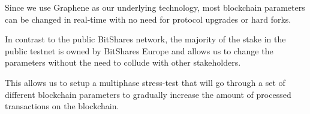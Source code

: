 Since we use Graphene as our underlying technology, most blockchain parameters
can be changed in real-time with no need for protocol upgrades or hard forks.

In contrast to the public BitShares network, the majority of the stake in the
public testnet is owned by BitShares Europe and allows us to change the
parameters without the need to collude with other stakeholders.

This allows us to setup a multiphase stress-test that will go through a set of
different blockchain parameters to gradually increase the amount of
processed transactions on the blockchain.
